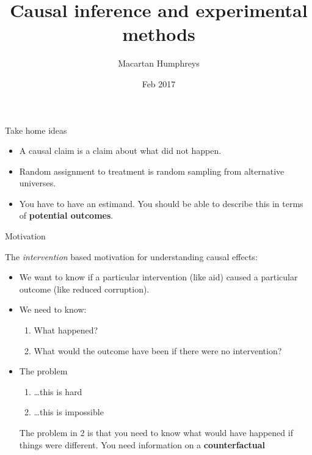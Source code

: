\documentclass[11pt,ignorenonframetext,]{beamer}
\title{Causal inference and experimental methods}
\author{Macartan Humphreys}
\date{Feb 2017}
\begin{document}
\frame{\titlepage}

\begin{frame}{Take home ideas}

\begin{itemize}
\item
  A causal claim is a claim about what did not happen.
\item
  Random assignment to treatment is random sampling from alternative
  universes.
\item
  You have to have an estimand. You should be able to describe this in
  terms of \textbf{potential outcomes}.
\end{itemize}

\end{frame}

\begin{frame}{Motivation}

The \textit{intervention} based motivation for understanding causal
effects:

\begin{itemize}
    \item  We want to know if a particular  intervention (like aid) caused a particular outcome (like reduced corruption). 
    \item  We need to know:
\begin{enumerate}
    \item What happened?
    \item What would the outcome have been if there were no intervention?
\end{enumerate}

    \item  The problem
\begin{enumerate}
    \item \dots this is hard
    \item \dots this is impossible
\end{enumerate}

The problem in 2 is that you need to know what would have happened if things were different. You need information on a \textbf{counterfactual}
\end{itemize}

\end{frame}
\end{document}
